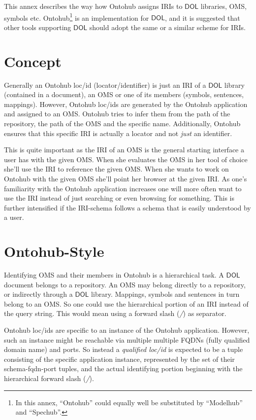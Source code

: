 \documentclass[10pt,fleqn,final]{scrreprt}
\newcommand*{\DOL}{\ensuremath{\mathsf{DOL}}\xspace}
\begin{document}
This annex describes the way how Ontohub assigns IRIs to \DOL
libraries, OMS, symbols etc. Ontohub\footnote{In this annex,
  ``Ontohub'' could equally well be substituted by ``Modelhub'' and
  ``Spechub''.} is  an implementation  for \DOL, and it is
suggested that other tools supporting \DOL should adopt the same or a
similar scheme for IRIs.


\section{Concept}

Generally an Ontohub loc/id (locator/identifier) is just an IRI of a
\DOL library (contained in a document), an OMS
or one of its members (symbols, sentences, mappings). However,
Ontohub loc/ids are generated by the Ontohub application and assigned to an
OMS. Ontohub tries to infer them from the path of the repository, the path of
the OMS and the specific name. Additionally, Ontohub ensures that this specific
IRI is actually a locator and not \emph{just} an identifier.

This is quite important as the IRI of an OMS is the general starting
interface a user has with the given OMS. When she evaluates the OMS
in her tool of choice she'll use the IRI to reference the given OMS. When
she wants to work on Ontohub with the given OMS she'll point her browser
at the given IRI. As one's familiarity with the Ontohub application increases one
will more often want to use the IRI instead of just searching or even browsing
for something.  This is further intensified if the IRI-schema follows a schema
that is easily understood by a user.

\section{Ontohub-Style}

Identifying OMS and their members in Ontohub is a hierarchical
task. A \DOL document belongs to a repository. An OMS may belong
directly to a repository, or indirectly through a \DOL library. Mappings,
symbols and sentences in turn belong to an OMS. So one could use the
hierarchical portion of an IRI instead of the query string.  This
would mean using a forward slash (\emph{/}) as separator.

Ontohub loc/ids are specific to an instance of the Ontohub application. However,
such an instance might be reachable via multiple multiple FQDNs (fully
qualified domain name) and ports. So instead a
\emph{qualified loc/id} is expected to be a tuple consisting of the specific application
instance, represented by the set of their schema-fqdn-port tuples, and the
actual identifying portion beginning with the hierarchical forward slash
(\emph{/}).
\end{document}
